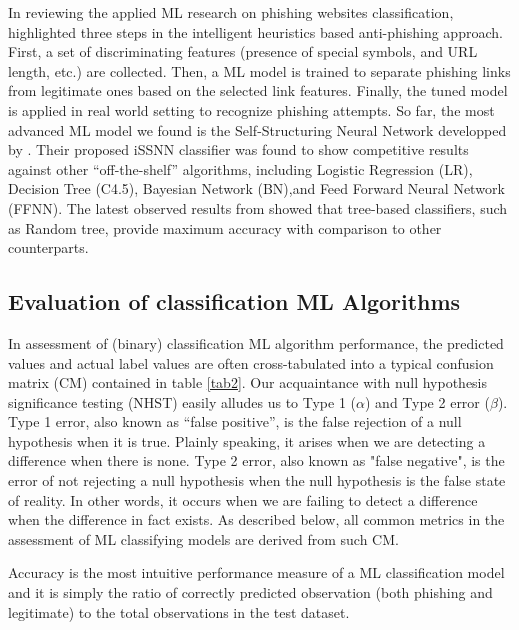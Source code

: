 \documentclass[deca,blindrev]{informs3} %
\begin{document}
In reviewing the applied ML research on phishing websites classification,   \cite{Mohammad2015a} highlighted three steps in the intelligent  heuristics  based  anti-phishing approach.  First, a set of discriminating features (presence of special symbols, and URL length, etc.) are collected. Then,  a ML model is trained to separate phishing links from legitimate ones based on the selected link features. Finally, the tuned model is applied in real world setting to recognize phishing attempts.  So far, the most advanced ML model we found is the Self-Structuring Neural Network developped by \cite{7727750}. Their proposed iSSNN classifier was found to show competitive results against other ``off-the-shelf'' algorithms, including Logistic Regression (LR), Decision Tree (C4.5), Bayesian Network (BN),and  Feed Forward Neural Network (FFNN).
The latest observed results from \cite{10.1007/978-981-10-5699-4_50}  showed that tree-based classifiers, such as Random tree,  provide maximum accuracy with comparison to other counterparts.

 



\subsection{Evaluation of classification  ML Algorithms}

In assessment of (binary) classification  ML algorithm performance, the predicted  values and actual label values  are often cross-tabulated into  a typical confusion matrix (CM) contained in  table \ref{tab2}. Our acquaintance with null hypothesis  significance  testing (NHST) easily alludes us to Type 1 ($\alpha$) and  Type 2 error ($\beta$). Type 1 error,  also known as “false positive”, is the false rejection of a null hypothesis when it is true. Plainly speaking, it arises when we are detecting a difference when there is none. Type 2  error, also known as "false negative", is the error of not rejecting a null hypothesis when the null hypothesis is the false state of reality. In other words, it occurs when we are failing to detect a difference when the difference in fact exists. As described below, all common metrics in the assessment of ML classifying models are derived from such CM.

Accuracy is the most intuitive performance measure of a ML classification model  and it is simply the ratio of correctly predicted observation (both phishing and legitimate) to the total observations in the test dataset.
\end{document}
